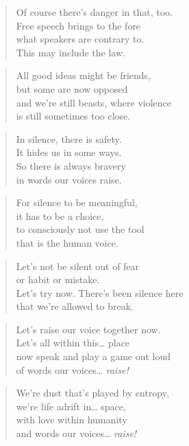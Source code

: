\documentclass[10pt,a4paper]{article}
\begin{document}
\begin{multicols}{2}
\begin{verse}
Of course there’s danger in that, too.\\
Free speech brings to the fore\\
what speakers are contrary to.\\
This may include the law.
\end{verse}

\begin{verse}
All good ideas might be friends,\\
but some are now opposed\\
and we’re still beasts, where violence\\
is still sometimes too close.
\end{verse}

\begin{verse}
In silence, there is safety.\\
It hides us in some ways.\\
So there is always bravery\\
in words our voices raise.\\
\end{verse}

\begin{verse}
For silence to be meaningful,\\
it has to be a choice,\\
to consciously not use the tool\\
that is the human voice.
\end{verse}

\begin{verse}
Let’s not be silent out of fear\\
or habit or mistake.\\
Let’s try now. There’s been silence here\\
that we’re allowed to break.
\end{verse}

\begin{verse}
Let’s raise our voice together now.\\
Let’s all within this… place\\
now speak and play a game out loud\\
of words our voices… \emph{raise!}
\end{verse}

\begin{verse}
We’re dust that’s played by entropy,\\
we’re life adrift in… space,\\
with love within humanity\\
and words our voices… \emph{raise!}
\end{verse}


\end{multicols}
\end{document}
